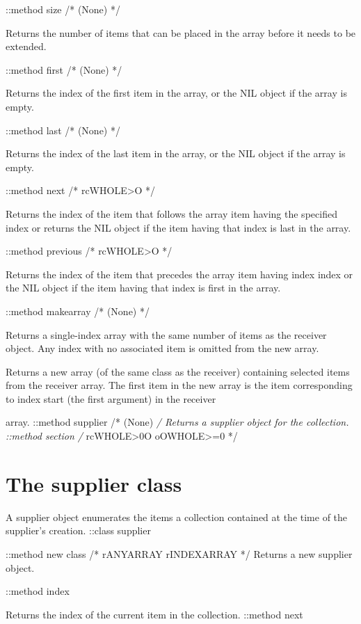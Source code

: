 ::method size /* (None) */

Returns the number of items that can be placed in the array before it
needs to be extended.

::method first /* (None) */

Returns the index of the first item in the array, or the NIL object if
the array is empty.

::method last /* (None) */

Returns the index of the last item in the array, or the NIL object if
the array is empty.

::method next /* rcWHOLE\textgreater O */

Returns the index of the item that follows the array item having the
specified index or returns the NIL object if the item having that index
is last in the array.

::method previous /* rcWHOLE\textgreater O */

Returns the index of the item that precedes the array item having index
index or the NIL object if the item having that index is first in the
array.

::method makearray /* (None) */

Returns a single-index array with the same number of items as the
receiver object. Any index with no associated item is omitted from the
new array.

Returns a new array (of the same class as the receiver) containing
selected items from the receiver array. The first item in the new array
is the item corresponding to index start (the first argument) in the
receiver

array. ::method supplier /* (None) \emph{/ Returns a supplier object for
the collection. ::method section /} rcWHOLE\textgreater0O
oOWHOLE\textgreater=0 */

\hypertarget{the-supplier-class}{%
\section{The supplier class}\label{the-supplier-class}}

A supplier object enumerates the items a collection contained at the
time of the supplier's creation. ::class supplier

::method new class /* rANYARRAY rINDEXARRAY */ Returns a new supplier
object.

::method index

Returns the index of the current item in the collection. ::method next

